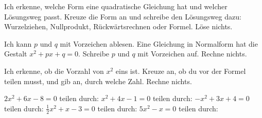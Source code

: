\clearpage
\setcounter{aufgabe}{24}
\hypertarget{e3}{}

\begin{aufgabe}{Ich erkenne, welche Form eine quadratische Gleichung hat und welcher Lösungsweg passt. Kreuze die Form an und schreibe den Lösungsweg dazu: Wurzelziehen, Nullprodukt, Rückwärtsrechnen oder Formel. Löse nichts.}
\end{aufgabe}

\begin{aufgabe}{Ich kann $p$ und $q$ mit Vorzeichen ablesen. Eine Gleichung in Normalform hat die Gestalt $x^2 + px + q = 0$. Schreibe $p$ und $q$ mit Vorzeichen auf. Rechne nichts.}
\begin{geruest}
\end{geruest}
\end{aufgabe}

\begin{aufgabe}{Ich erkenne, ob die Vorzahl von $x^2$ eins ist. Kreuze an, ob du vor der Formel teilen musst, und gib an, durch welche Zahl. Rechne nichts.}
\begin{teile}
\teil $2x^2 + 6x - 8 = 0$ \hfill {}\quad teilen durch: \leerfeld
\teil $x^2 + 4x - 1 = 0$ \hfill {}\quad teilen durch: \leerfeld
\teil $-x^2 + 3x + 4 = 0$ \hfill {}\quad teilen durch: \leerfeld
\teil $\frac{1}{2}x^2 + x - 3 = 0$ \hfill {}\quad teilen durch: \leerfeld
\teil $5x^2 - x = 0$ \hfill {}\quad teilen durch: \leerfeld
\end{teile}
\end{aufgabe}

